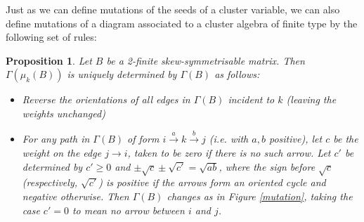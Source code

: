 \documentclass[11pt]{amsart}
\newtheorem{prop}[thm]{Proposition}
\theoremstyle{definition}
\begin{document}
Just as we can define mutations of the seeds of a cluster variable, we can also define mutations of a diagram associated to a cluster algebra of finite type by the following set of rules:
\begin{prop}\cite{FZ03}
Let $B$ be a 2-finite skew-symmetrisable matrix. Then $\Gamma(\mu_k(B))$ is uniquely determined by $\Gamma(B)$ as follows:
\begin{itemize}
\item Reverse the orientations of all edges in $\Gamma(B)$ incident to $k$ (leaving the weights unchanged)
\item For any path in $\Gamma(B)$ of form $i \xrightarrow{a} k \xrightarrow{b} j$ (i.e. with $a,b$ positive), let $c$ be the weight on the edge $j \rightarrow i$, taken to be zero if there is no such arrow. Let $c'$ be determined by $c'\geq 0$ and
$\pm \sqrt{c} \pm \sqrt{c'} = \sqrt{ab}$, 
where the sign before $\sqrt{c}$ (respectively, $\sqrt{c'}$) is positive if the arrows form an oriented cycle and negative otherwise. Then $\Gamma(B)$ changes as in Figure \ref{mutation}, taking the case $c' = 0$ to mean no arrow between $i$ and $j$.
\end{itemize}
\end{prop}

\begin{center}
   \end{center}
   
\end{document}
